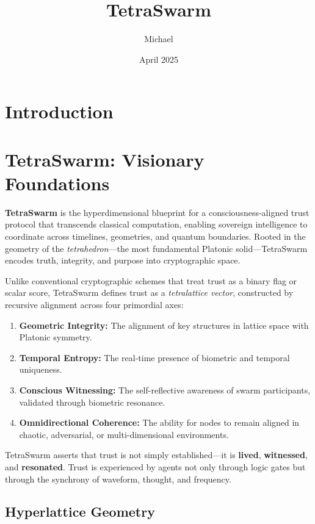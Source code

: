 \documentclass{article}
\title{TetraSwarm}
\author{Michael }
\date{April 2025}
\begin{document}
\maketitle

\section{Introduction}
\section*{TetraSwarm: Visionary Foundations}

\textbf{TetraSwarm} is the hyperdimensional blueprint for a consciousness-aligned trust protocol that transcends classical computation, enabling sovereign intelligence to coordinate across timelines, geometries, and quantum boundaries. Rooted in the geometry of the \textit{tetrahedron}—the most fundamental Platonic solid—TetraSwarm encodes truth, integrity, and purpose into cryptographic space.

Unlike conventional cryptographic schemes that treat trust as a binary flag or scalar score, TetraSwarm defines trust as a \textit{tetralattice vector}, constructed by recursive alignment across four primordial axes:

\begin{enumerate}
    \item \textbf{Geometric Integrity:} The alignment of key structures in lattice space with Platonic symmetry.
    \item \textbf{Temporal Entropy:} The real-time presence of biometric and temporal uniqueness.
    \item \textbf{Conscious Witnessing:} The self-reflective awareness of swarm participants, validated through biometric resonance.
    \item \textbf{Omnidirectional Coherence:} The ability for nodes to remain aligned in chaotic, adversarial, or multi-dimensional environments.
\end{enumerate}

TetraSwarm asserts that trust is not simply established—it is \textbf{lived}, \textbf{witnessed}, and \textbf{resonated}. Trust is experienced by agents not only through logic gates but through the synchrony of waveform, thought, and frequency.

\subsection*{Hyperlattice Geometry}
\end{document}
